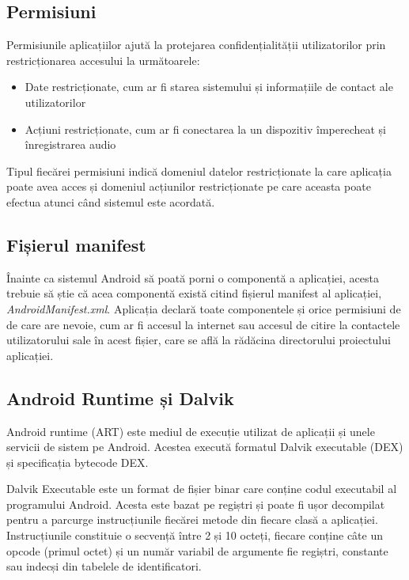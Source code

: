 \documentclass[12pt,a4paper]{report}
\begin{document}
\subsection{Permisiuni}
Permisiunile aplicațiilor ajută la protejarea confidențialității utilizatorilor prin restricționarea accesului la următoarele:
\begin{itemize}
      \item Date restricționate, cum ar fi starea sistemului și informațiile de contact ale utilizatorilor
      \item Acțiuni restricționate, cum ar fi conectarea la un dispozitiv împerecheat și înregistrarea audio
\end{itemize}

Tipul fiecărei permisiuni indică domeniul datelor restricționate la care aplicația poate avea acces și domeniul acțiunilor restricționate
pe care aceasta poate efectua atunci când sistemul este acordată.\cite{android-permissions}

\subsection{Fișierul manifest}
Înainte ca sistemul Android să poată porni o componentă a aplicației, acesta trebuie să știe că acea componentă există citind fișierul manifest al aplicației,
\textit{AndroidManifest.xml}. Aplicația declară toate componentele și orice permisiuni de de care are nevoie,
cum ar fi accesul la internet sau accesul de citire la contactele utilizatorului sale în acest fișier,
care se află la rădăcina directorului proiectului aplicației.\cite{android-application-fundamentals}

\subsection{Android Runtime și Dalvik}
Android runtime (ART) este mediul de execuție utilizat de aplicații și unele servicii de sistem pe Android.
Acestea execută formatul Dalvik executable (DEX) și specificația bytecode DEX.\cite{android-runtime}

Dalvik Executable este un format de fișier binar care conține codul executabil al programului Android.
Acesta este bazat pe regiștri și poate fi ușor decompilat pentru a parcurge instrucțiunile fiecărei metode din fiecare clasă a aplicației.
Instrucțiunile constituie o secvență între 2 și 10 octeți, fiecare conține câte un opcode (primul octet) și un număr variabil de argumente fie regiștri, constante sau indecși din tabelele de identificatori.
\end{document}
